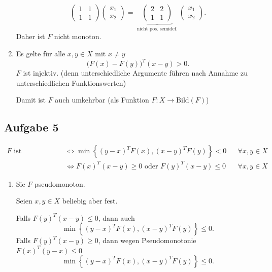 \begin{enumerate}[label=(\alph{enumi})]
\[\begin{pmatrix}
				1 & 1 \\ 1 & 1
			\end{pmatrix}
			\begin{pmatrix}
			x_1 \\ x_2
			\end{pmatrix}
			= \underbrace{ 
			\begin{pmatrix}
				2 & 2 \\ 1 & 1
			\end{pmatrix}
			}_{\text{ nicht pos. semidef. }}
			\begin{pmatrix}
			x_1 \\ x_2
			\end{pmatrix}
		.\] 
		Daher ist $F$ nicht monoton.
	\item Es gelte für alle $x,y \in X$ mit $x \neq y$
		\[
			\Big( F(x) - F(y) \Big) ^{T}(x-y) > 0 
		.\] 
		$F$ ist injektiv. (denn unterschiedliche Argumente führen nach Annahme zu unterschiedlichen Funktionswerten)

		Damit ist $F$ auch umkehrbar (als Funktion $F \colon X \rightarrow \text{Bild}(F) $)
\end{enumerate}

\subsection*{Aufgabe 5}
\label{sec:Aufgabe 5}
\begin{align*}
	F \text{ ist quasimonoton } &\iff \min\limits_{} \left\{ (y-x)^{T}F(x), (x-y)^{T}F(y) \right\} < 0& &\forall x,y \in X \\
								&\iff F(x)^{T}(x-y) \geq 0 \text{ oder } F(y)^{T}(x-y) \leq 0& &\forall x,y \in X
\end{align*}
\begin{enumerate}[label=(\alph{enumi})]
	\item Sie $F$ pseudomonoton.

		Seien $x,y \in X$ beliebig aber fest.
		
		Falls $F(y)^{T}(x-y) \leq 0$, dann auch 
		\[
			\min\limits_{}\left\{ (y-x)^{T}F(x), (x-y)^{T}F(y) \right\} \leq 0
		.\] 
		Falls $F(y)^{T}(x-y) \geq 0$, dann wegen Pseudomonotonie $F(x)^{T}(y-x) \leq 0$
		\[
			\min\limits_{}\left\{ (y-x)^{T}F(x), (x-y)^{T}F(y) \right\} \leq 0
		.\] 
\end{enumerate}


